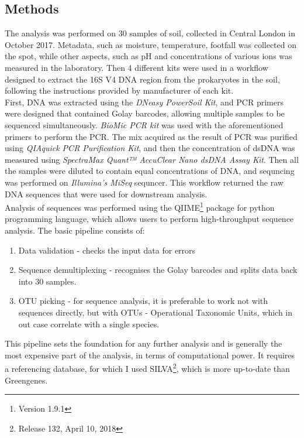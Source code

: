 \documentclass{article}
\begin{document}
\begin{multicols}{2}
\section{Methods}
The analysis was performed on 30 samples of soil, collected in Central London in October 2017. Metadata, such as moisture, temperature, footfall was collected on the spot, while other aspects, such as pH and concentrations of various ions was measured in the laboratory. Then 4 different kits were used in a workflow designed to extract the 16S V4 DNA region from the prokaryotes in the soil, following the instructions provided by manufacturer of each kit. \\
%
First, DNA was extracted using the \textit{DNeasy PowerSoil Kit}, and PCR primers were designed that contained Golay barcodes, allowing multiple samples to be sequenced simultaneously. \textit{BioMic PCR kit} was used with the aforementioned primers to perform the PCR. The mix acquired as the result of PCR was purified using \textit{QIAquick PCR Purification Kit}, and then the concentration of dsDNA was measured using \textit{SpectraMax Quant™ AccuClear Nano dsDNA Assay Kit}. Then all the samples were diluted to contain equal concentrations of DNA, and sequncing was performed on \textit{Illumina's MiSeq} sequncer. This workflow returned the raw DNA sequences that were used for downstream analysis.\\
Analysis of sequences was performed using the QIIME\footnote{Version 1.9.1} package\cite{Caporaso2010,Kuczynski2012} for python programming language, which allows users to perform high-throughput sequence analysis. The basic pipeline consists of:
\begin{enumerate}
	\item Data validation - checks the input data for errors
	\item Sequence demultiplexing - recognises the Golay barcodes and splits data back into 30 samples.
	\item OTU picking - for sequence analysis, it is preferable to work not with sequences directly, but with OTUs - Operational Taxonomic Units, which in out case correlate with a single species.
\end{enumerate}
This pipeline sets the foundation for any further analysis and is generally the most expensive part of the analysis, in terms of computational power. It requires a referencing database, for which I used SILVA\cite{Quast2012}\footnote{Release 132, April 10, 2018}, which is more up-to-date than Greengenes\cite{McDonald2012}.\\

\end{multicols}
\end{document}
